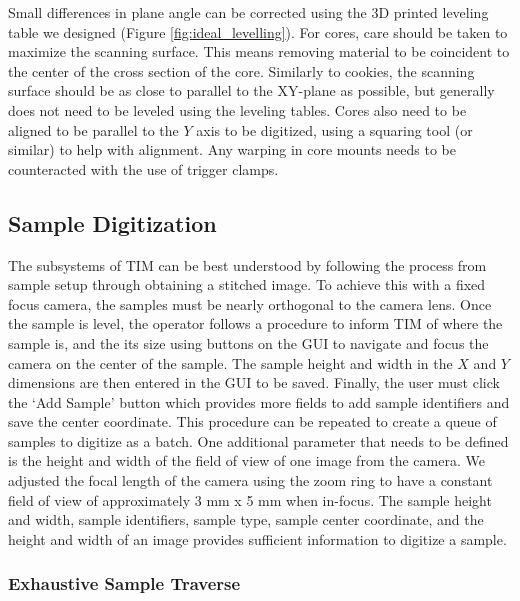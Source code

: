 \documentclass[a4paper,12pt]{article}
\begin{document}
Small differences in plane angle can be corrected using the 3D printed leveling table we designed (Figure \ref{fig:ideal_levelling}). 
For cores, care should be taken to maximize the scanning surface. This means removing material to be coincident to the center of the cross section of the core. 
Similarly to cookies, the scanning surface should be as close to parallel to the XY-plane as possible, but generally does not need to be leveled using the leveling tables.
Cores also need to be aligned to be parallel to the $Y$ axis to be digitized, using a squaring tool (or similar) to help with alignment. Any warping in core mounts needs to be counteracted with the use of trigger clamps. 

\subsection{Sample Digitization} %

The subsystems of TIM can be best understood by following the process from sample setup through obtaining a stitched image. 
To achieve this with a fixed focus camera, the samples must be nearly orthogonal to the camera lens. 
Once the sample is level, the operator follows a procedure to inform TIM of where the sample is, and the its size using buttons on the GUI to navigate and focus the camera on the center of the sample. 
The sample height and width in the $X$ and $Y$ dimensions are then entered in the GUI to be saved. Finally, the user must click the `Add Sample' button which provides more fields to add sample identifiers and save the center coordinate.
This procedure can be repeated to create a queue of samples to digitize as a batch. One additional parameter that needs to be defined is the height and width of the field of view of one image from the camera. %
We adjusted the focal length of the camera using the zoom ring to have a constant field of view of approximately 3 mm x 5 mm when in-focus.  
The sample height and width, sample identifiers, sample type, sample center coordinate, and the height and width of an image provides sufficient information to digitize a sample.

\subsubsection{Exhaustive Sample Traverse}  
\end{document}
